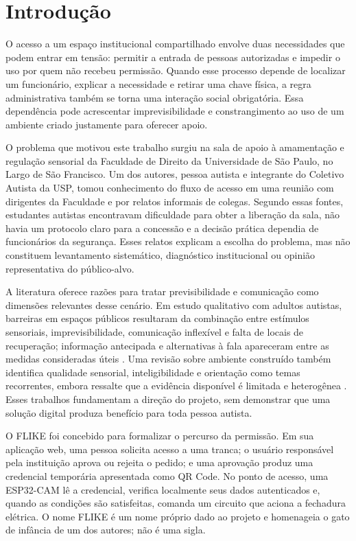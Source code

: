 \chapter{Introdução} \label{cap:introducao}

O acesso a um espaço institucional compartilhado envolve duas necessidades que podem entrar em tensão: permitir a entrada de pessoas autorizadas e impedir o uso por quem não recebeu permissão. Quando esse processo depende de localizar um funcionário, explicar a necessidade e retirar uma chave física, a regra administrativa também se torna uma interação social obrigatória. Essa dependência pode acrescentar imprevisibilidade e constrangimento ao uso de um ambiente criado justamente para oferecer apoio.

O problema que motivou este trabalho surgiu na sala de apoio à amamentação e regulação sensorial da Faculdade de Direito da Universidade de São Paulo, no Largo de São Francisco. Um dos autores, pessoa autista e integrante do Coletivo Autista da USP, tomou conhecimento do fluxo de acesso em uma reunião com dirigentes da Faculdade e por relatos informais de colegas. Segundo essas fontes, estudantes autistas encontravam dificuldade para obter a liberação da sala, não havia um protocolo claro para a concessão e a decisão prática dependia de funcionários da segurança. Esses relatos explicam a escolha do problema, mas não constituem levantamento sistemático, diagnóstico institucional ou opinião representativa do público-alvo.

A literatura oferece razões para tratar previsibilidade e comunicação como dimensões relevantes desse cenário. Em estudo qualitativo com adultos autistas, barreiras em espaços públicos resultaram da combinação entre estímulos sensoriais, imprevisibilidade, comunicação inflexível e falta de locais de recuperação; informação antecipada e alternativas à fala apareceram entre as medidas consideradas úteis \cite{maclennan2023sensory}. Uma revisão sobre ambiente construído também identifica qualidade sensorial, inteligibilidade e orientação como temas recorrentes, embora ressalte que a evidência disponível é limitada e heterogênea \cite{tola2021builtenvironment}. Esses trabalhos fundamentam a direção do projeto, sem demonstrar que uma solução digital produza benefício para toda pessoa autista.

O FLIKE foi concebido para formalizar o percurso da permissão. Em sua aplicação web, uma pessoa solicita acesso a uma tranca; o usuário responsável pela instituição aprova ou rejeita o pedido; e uma aprovação produz uma credencial temporária apresentada como QR Code. No ponto de acesso, uma ESP32-CAM lê a credencial, verifica localmente seus dados autenticados e, quando as condições são satisfeitas, comanda um circuito que aciona a fechadura elétrica. O nome FLIKE é um nome próprio dado ao projeto e homenageia o gato de infância de um dos autores; não é uma sigla.

